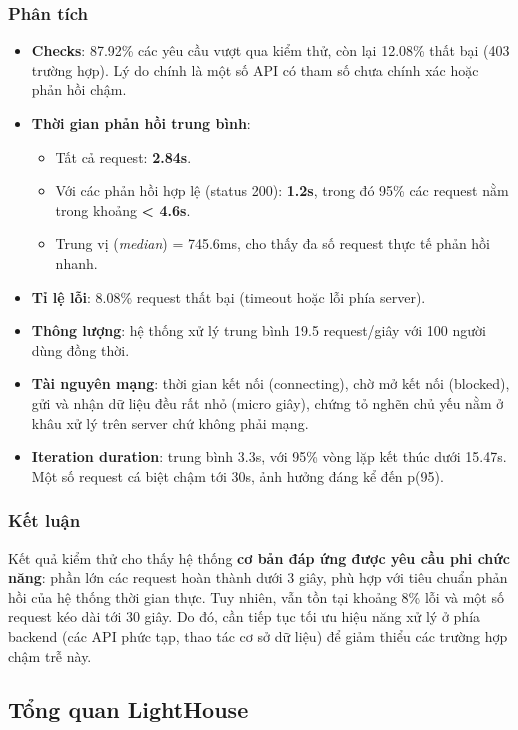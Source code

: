 \subsubsection{Phân tích}
\begin{itemize}
    \item \textbf{Checks}: 87.92\% các yêu cầu vượt qua kiểm thử, còn lại 12.08\% thất bại (403 trường hợp). Lý do chính là một số API có tham số chưa chính xác hoặc phản hồi chậm.
    \item \textbf{Thời gian phản hồi trung bình}: 
        \begin{itemize}
            \item Tất cả request: \textbf{2.84s}.
            \item Với các phản hồi hợp lệ (status 200): \textbf{1.2s}, trong đó 95\% các request nằm trong khoảng \textbf{< 4.6s}.
            \item Trung vị (\textit{median}) = 745.6ms, cho thấy đa số request thực tế phản hồi nhanh.
        \end{itemize}
    \item \textbf{Tỉ lệ lỗi}: 8.08\% request thất bại (timeout hoặc lỗi phía server).
    \item \textbf{Thông lượng}: hệ thống xử lý trung bình 19.5 request/giây với 100 người dùng đồng thời.
    \item \textbf{Tài nguyên mạng}: thời gian kết nối (connecting), chờ mở kết nối (blocked), gửi và nhận dữ liệu đều rất nhỏ (micro giây), chứng tỏ nghẽn chủ yếu nằm ở khâu xử lý trên server chứ không phải mạng.
    \item \textbf{Iteration duration}: trung bình 3.3s, với 95\% vòng lặp kết thúc dưới 15.47s. Một số request cá biệt chậm tới 30s, ảnh hưởng đáng kể đến p(95).
\end{itemize}

\subsubsection{Kết luận}
Kết quả kiểm thử cho thấy hệ thống \textbf{cơ bản đáp ứng được yêu cầu phi chức năng}: phần lớn các request hoàn thành dưới 3 giây, phù hợp với tiêu chuẩn phản hồi của hệ thống thời gian thực. Tuy nhiên, vẫn tồn tại khoảng 8\% lỗi và một số request kéo dài tới 30 giây. Do đó, cần tiếp tục tối ưu hiệu năng xử lý ở phía backend (các API phức tạp, thao tác cơ sở dữ liệu) để giảm thiểu các trường hợp chậm trễ này.

\subsection{Tổng quan LightHouse}


